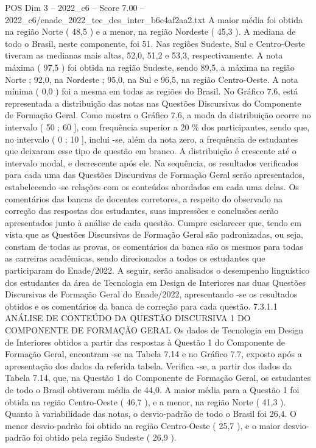 \begin{textsample}{POS Dim 3 – 2022\_c6 – Score 7.00 – 2022\_c6/enade\_2022\_tec\_des\_inter\_b6c4af2aa2.txt}
A maior média foi obtida na região Norte ( 48,5 ) e a menor, na região Nordeste ( 45,3 ).
A mediana de todo o Brasil, neste componente, foi 51.
Nas regiões Sudeste, Sul e Centro-Oeste tiveram as medianas mais altas, 52,0, 51,2 e 53,3, respectivamente.
A nota máxima ( 97,5 ) foi obtida na região Sudeste, sendo 89,5, a máxima na região Norte ; 92,0, na Nordeste ; 95,0, na Sul e 96,5, na região Centro-Oeste.
A nota mínima ( 0,0 ) foi a mesma em todas as regiões do Brasil.
No Gráfico 7.6, está representada a distribuição das notas nas Questões Discursivas do Componente de Formação Geral.
Como mostra o Gráfico 7.6, a moda da distribuição ocorre no intervalo ( 50 ; 60 ], com frequência superior a 20 \% dos participantes, sendo que, no intervalo ( 0 ; 10 ], inclui -se, além da nota zero, a frequência de estudantes que deixaram esse tipo de questão em branco.
A distribuição é crescente até o intervalo modal, e decrescente após ele.
Na sequência, os resultados verificados para cada uma das Questões Discursivas de Formação Geral serão apresentados, estabelecendo -se relações com os conteúdos abordados em cada uma delas.
Os comentários das bancas de docentes corretores, a respeito do observado na correção das respostas dos estudantes, suas impressões e conclusões serão apresentados junto à análise de cada questão.
Cumpre esclarecer que, tendo em vista que as Questões Discursivas de Formação Geral são padronizadas, ou seja, constam de todas as provas, os comentários da banca são os mesmos para todas as carreiras acadêmicas, sendo direcionados a todos os estudantes que participaram do Enade/2022.
A seguir, serão analisados o desempenho linguístico dos estudantes da área de Tecnologia em Design de Interiores nas duas Questões Discursivas de Formação Geral do Enade/2022, apresentando -se os resultados obtidos e os comentários da banca de correção para cada questão. 7.3.1.1 ANÁLISE DE CONTEÚDO DA QUESTÃO DISCURSIVA 1 DO COMPONENTE DE FORMAÇÃO GERAL Os dados de Tecnologia em Design de Interiores obtidos a partir das respostas à Questão 1 do Componente de Formação Geral, encontram -se na Tabela 7.14 e no Gráfico 7.7, exposto após a apresentação dos dados da referida tabela.
Verifica -se, a partir dos dados da Tabela 7.14, que, na Questão 1 do Componente de Formação Geral, os estudantes de todo o Brasil obtiveram média de 44,0.
A maior média para a Questão 1 foi obtida na região Centro-Oeste ( 46,7 ), e a menor, na região Norte ( 41,3 ).
Quanto à variabilidade das notas, o desvio-padrão de todo o Brasil foi 26,4.
O menor desvio-padrão foi obtido na região Centro-Oeste ( 25,7 ), e o maior desvio-padrão foi obtido pela região Sudeste ( 26,9 ).

\end{textsample}
